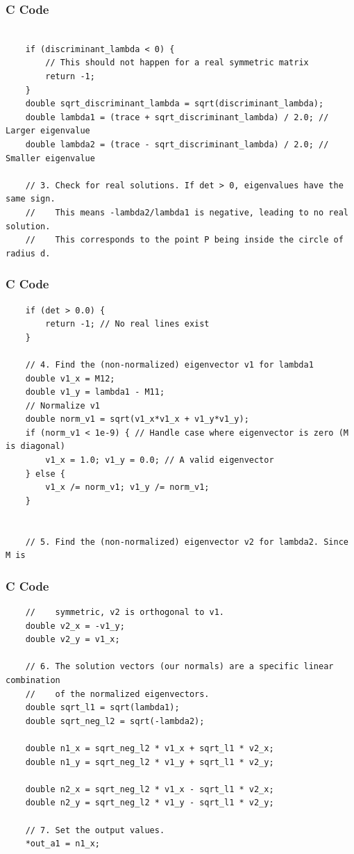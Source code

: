 \documentclass{beamer}
\begin{document}
\begin{frame}[fragile]
\frametitle{C Code }
\begin{lstlisting}

    if (discriminant_lambda < 0) {
        // This should not happen for a real symmetric matrix
        return -1;
    }
    double sqrt_discriminant_lambda = sqrt(discriminant_lambda);
    double lambda1 = (trace + sqrt_discriminant_lambda) / 2.0; // Larger eigenvalue
    double lambda2 = (trace - sqrt_discriminant_lambda) / 2.0; // Smaller eigenvalue

    // 3. Check for real solutions. If det > 0, eigenvalues have the same sign.
    //    This means -lambda2/lambda1 is negative, leading to no real solution.
    //    This corresponds to the point P being inside the circle of radius d.
    \end{lstlisting}    
\end{frame}
\begin{frame}[fragile]
\frametitle{C Code }
\begin{lstlisting}
    if (det > 0.0) {
        return -1; // No real lines exist
    }

    // 4. Find the (non-normalized) eigenvector v1 for lambda1
    double v1_x = M12;
    double v1_y = lambda1 - M11;
    // Normalize v1
    double norm_v1 = sqrt(v1_x*v1_x + v1_y*v1_y);
    if (norm_v1 < 1e-9) { // Handle case where eigenvector is zero (M is diagonal)
        v1_x = 1.0; v1_y = 0.0; // A valid eigenvector
    } else {
        v1_x /= norm_v1; v1_y /= norm_v1;
    }


    // 5. Find the (non-normalized) eigenvector v2 for lambda2. Since M is
\end{lstlisting}    
\end{frame}
\begin{frame}[fragile]
\frametitle{C Code }
\begin{lstlisting}
    //    symmetric, v2 is orthogonal to v1.
    double v2_x = -v1_y;
    double v2_y = v1_x;

    // 6. The solution vectors (our normals) are a specific linear combination
    //    of the normalized eigenvectors.
    double sqrt_l1 = sqrt(lambda1);
    double sqrt_neg_l2 = sqrt(-lambda2);

    double n1_x = sqrt_neg_l2 * v1_x + sqrt_l1 * v2_x;
    double n1_y = sqrt_neg_l2 * v1_y + sqrt_l1 * v2_y;
    
    double n2_x = sqrt_neg_l2 * v1_x - sqrt_l1 * v2_x;
    double n2_y = sqrt_neg_l2 * v1_y - sqrt_l1 * v2_y;

    // 7. Set the output values.
    *out_a1 = n1_x;
\end{lstlisting}    
\end{frame}
\end{document}
